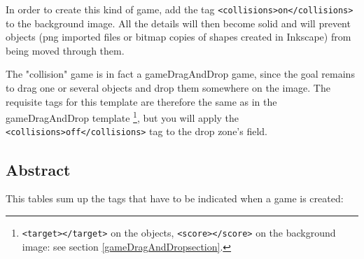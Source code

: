In order to create this kind of game, add the tag \verb|<collisions>on</collisions>| to the 
background image. All the details will then become solid and will prevent objects 
(png imported files or bitmap copies of shapes created in Inkscape) from being moved through them.

The "collision" game is in fact a gameDragAndDrop game, since the goal remains to 
drag one or several objects and drop them somewhere on the image.
The requisite tags for this template are therefore the same as in the gameDragAndDrop template \footnote{\texttt{<target></target>} on the objects, \texttt{<score></score>} 
on the background image: see section \ref{gameDragAndDropsection}.}, but you will apply the  \verb|<collisions>off</collisions>| tag to the drop zone's  field.
\newpage
\subsection{Abstract}

This tables sum up the tags that have to be indicated when a game is created:

